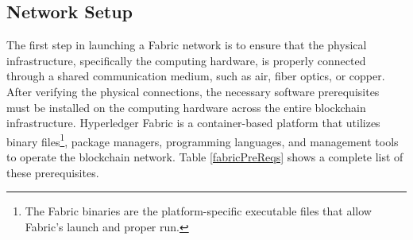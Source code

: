 \documentclass[conference]{IEEEtran}
\begin{document}
\subsection{Network Setup}
The first step in launching a Fabric network is to ensure that the physical infrastructure, specifically the computing hardware, is properly connected through a shared communication medium, such as air, fiber optics, or copper. After verifying the physical connections, the necessary software prerequisites must be installed on the computing hardware across the entire blockchain infrastructure. Hyperledger Fabric is a container-based platform that utilizes binary files\footnote{The Fabric binaries are the platform-specific executable files that allow Fabric's launch and proper run.}, package managers,  programming languages, and management tools to operate the blockchain network. Table \ref{fabricPreReqs} shows a complete list of these prerequisites. \\
%
\begin{table*}[]
\footnotesize
\centering
{}
\caption{Software prerequisites for Fabric's network implementation}
\label{fabricPreReqs}
\end{table*}
\end{document}

